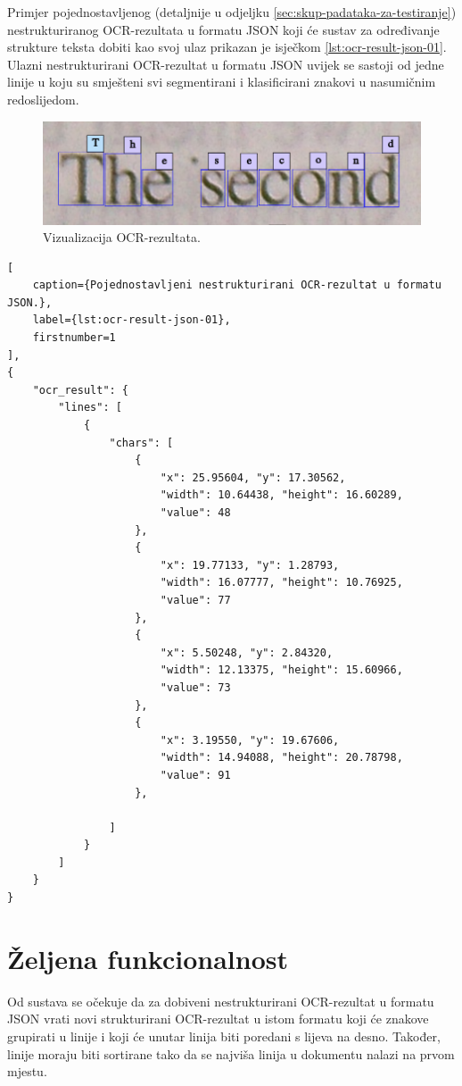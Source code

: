 \documentclass[times, utf8, zavrsni]{fer}
\begin{document}
Primjer pojednostavljenog (detaljnije u odjeljku
\ref{sec:skup-padataka-za-testiranje}) nestrukturiranog OCR-rezultata u formatu
JSON koji će sustav za određivanje strukture teksta dobiti kao svoj ulaz
prikazan je isječkom \ref{lst:ocr-result-json-01}. Ulazni nestrukturirani
OCR-rezultat u formatu JSON uvijek se sastoji od jedne linije u koju
su smješteni svi segmentirani i klasificirani znakovi u nasumičnim redoslijedom.

\begin{figure}[htb]
    \centering
    \includegraphics[width=\textwidth]{images/book-example-02.png}
    \caption{Vizualizacija OCR-rezultata.}
    \label{fig:book-example-02}
\end{figure}

\begin{lstlisting}[
    caption={Pojednostavljeni nestrukturirani OCR-rezultat u formatu JSON.},
    label={lst:ocr-result-json-01},
    firstnumber=1
],
{
    "ocr_result": {
        "lines": [
            {
                "chars": [
                    {
                        "x": 25.95604, "y": 17.30562,
                        "width": 10.64438, "height": 16.60289,
                        "value": 48
                    },
                    {
                        "x": 19.77133, "y": 1.28793,
                        "width": 16.07777, "height": 10.76925,
                        "value": 77
                    },
                    {
                        "x": 5.50248, "y": 2.84320,
                        "width": 12.13375, "height": 15.60966,
                        "value": 73
                    },
                    {
                        "x": 3.19550, "y": 19.67606,
                        "width": 14.94088, "height": 20.78798,
                        "value": 91
                    },

                ]
            }
        ]
    }
}
\end{lstlisting}








\section{Željena funkcionalnost}
\label{sec:željena-funkcionalnost}
Od sustava se očekuje da za dobiveni nestrukturirani OCR-rezultat u formatu
JSON vrati novi strukturirani OCR-rezultat u istom formatu koji će znakove
grupirati u linije i koji će unutar linija biti poredani s lijeva na desno.
Također, linije moraju biti sortirane tako da se najviša linija u dokumentu
nalazi na prvom mjestu.
\end{document}
